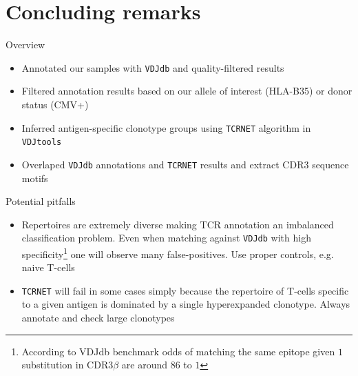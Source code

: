 \documentclass[12pt]{beamer}
\begin{document}
\section{Concluding remarks}

\begin{frame}{Overview}
\begin{itemize}
\item Annotated our samples with \texttt{VDJdb} and quality-filtered results
\item Filtered annotation results based on our allele of interest (HLA-B35) or donor status (CMV+)
\item Inferred antigen-specific clonotype groups using \texttt{TCRNET} algorithm in \texttt{VDJtools}
\item Overlaped \texttt{VDJdb} annotations and \texttt{TCRNET} results and extract CDR3 sequence motifs
\end{itemize}
\end{frame}

\begin{frame}{Potential pitfalls}
\begin{itemize}
\item Repertoires are extremely diverse making TCR annotation an imbalanced classification problem. Even when matching against \texttt{VDJdb} with high specificity\footnote{According to VDJdb benchmark odds of matching the same epitope given $1$ substitution in CDR3$\beta$ are around $86$ to $1$} one will observe many false-positives.
\colorbox{yellow!50!white}{Use proper controls, e.g. naive T-cells}
\item \texttt{TCRNET} will fail in some cases simply because the repertoire of T-cells specific to a given antigen is dominated by a single hyperexpanded clonotype.
\colorbox{yellow!50!white}{Always annotate and check large clonotypes}
\end{itemize}
\end{frame}
\end{document}
